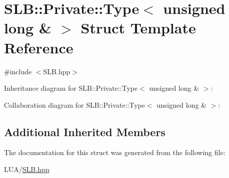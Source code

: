 \hypertarget{structSLB_1_1Private_1_1Type_3_01unsigned_01long_01_6_01_4}{}\section{S\+LB\+:\+:Private\+:\+:Type$<$ unsigned long \& $>$ Struct Template Reference}
\label{structSLB_1_1Private_1_1Type_3_01unsigned_01long_01_6_01_4}


{\ttfamily \#include $<$S\+L\+B.\+hpp$>$}



Inheritance diagram for S\+LB\+:\+:Private\+:\+:Type$<$ unsigned long \& $>$\+:


Collaboration diagram for S\+LB\+:\+:Private\+:\+:Type$<$ unsigned long \& $>$\+:
\subsection*{Additional Inherited Members}


The documentation for this struct was generated from the following file\+:\begin{DoxyCompactItemize}
\item 
L\+U\+A/\hyperlink{SLB_8hpp}{S\+L\+B.\+hpp}\end{DoxyCompactItemize}
